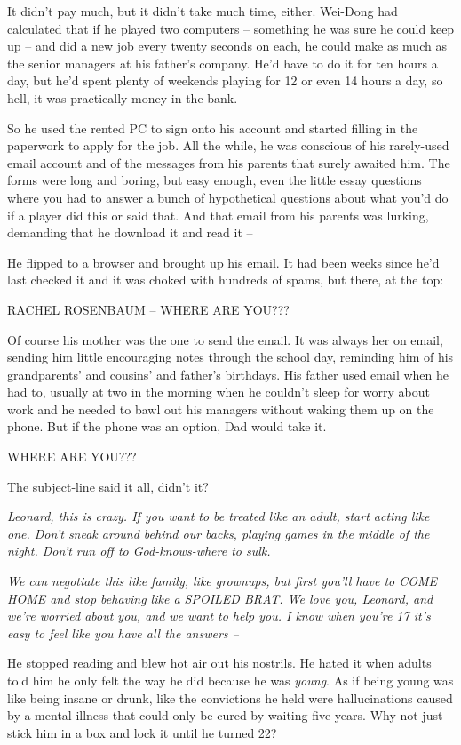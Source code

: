 It didn't pay much, but it didn't take much time, either. Wei-Dong
had calculated that if he played two computers -- something he was
sure he could keep up -- and did a new job every twenty seconds on
each, he could make as much as the senior managers at his father's
company. He'd have to do it for ten hours a day, but he'd spent
plenty of weekends playing for 12 or even 14 hours a day, so hell,
it was practically money in the bank.

So he used the rented PC to sign onto his account and started
filling in the paperwork to apply for the job. All the while, he
was conscious of his rarely-used email account and of the messages
from his parents that surely awaited him. The forms were long and
boring, but easy enough, even the little essay questions where you
had to answer a bunch of hypothetical questions about what you'd do
if a player did this or said that. And that email from his parents
was lurking, demanding that he download it and read it --

He flipped to a browser and brought up his email. It had been weeks
since he'd last checked it and it was choked with hundreds of
spams, but there, at the top:

RACHEL ROSENBAUM -- WHERE ARE YOU???

Of course his mother was the one to send the email. It was always
her on email, sending him little encouraging notes through the
school day, reminding him of his grandparents' and cousins' and
father's birthdays. His father used email when he had to, usually
at two in the morning when he couldn't sleep for worry about work
and he needed to bawl out his managers without waking them up on
the phone. But if the phone was an option, Dad would take it.

WHERE ARE YOU???

The subject-line said it all, didn't it?

\emph{Leonard, this is crazy. If you want to be treated like an adult, start acting like one. Don't sneak around behind our backs, playing games in the middle of the night. Don't run off to God-knows-where to sulk.}

\emph{We can negotiate this like family, like grownups, but first you'll have to COME HOME and stop behaving like a SPOILED BRAT. We love you, Leonard, and we're worried about you, and we want to help you. I know when you're 17 it's easy to feel like you have all the answers --}

He stopped reading and blew hot air out his nostrils. He hated it
when adults told him he only felt the way he did because he was
\emph{young}. As if being young was like being insane or drunk,
like the convictions he held were hallucinations caused by a mental
illness that could only be cured by waiting five years. Why not
just stick him in a box and lock it until he turned 22?

